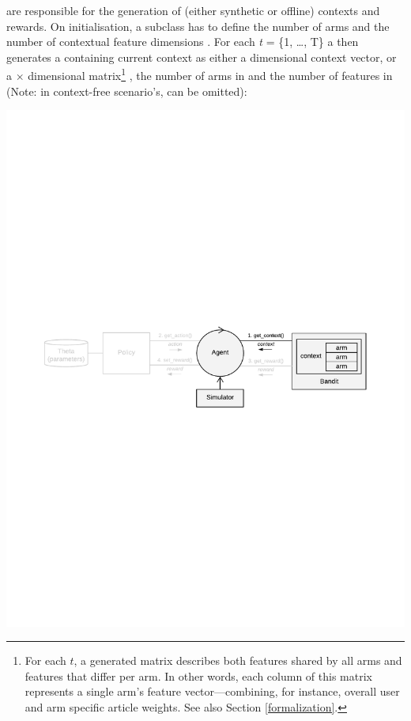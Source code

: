 \documentclass{jss}
\begin{document}
 are responsible for the generation of (either synthetic or offline) contexts and rewards. On initialisation, a  subclass has to define the number of arms  and the number of contextual feature dimensions . For each \emph{t} = \{1, \ldots, T\} a  then generates a  containing current context as either a  dimensional context vector, or a  $\times$  dimensional matrix\footnote{For each $t$, a  generated matrix describes both features shared by all arms and features that differ per arm. In other words, each column of this matrix represents a single arm's feature vector---combining, for instance, overall user and arm specific article weights. See also Section \ref{formalization}.} , the number of arms in  and the number of features in  (Note: in context-free scenario's,  can be omitted):

\includegraphics[width=\textwidth]{fig/all_cmab_phases_Part3}
\end{document}
